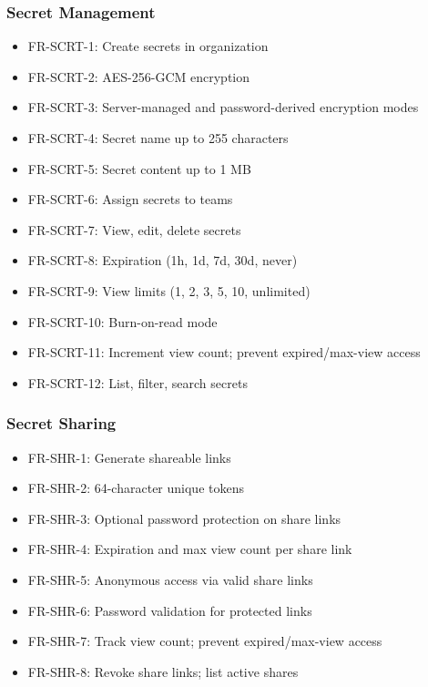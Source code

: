 \documentclass[12pt,a4paper]{article}
\begin{document}
\subsubsection{Secret Management}
\begin{itemize}[leftmargin=*, itemsep=0.1em]
  \item FR-SCRT-1: Create secrets in organization
  \item FR-SCRT-2: AES-256-GCM encryption
  \item FR-SCRT-3: Server-managed and password-derived encryption modes
  \item FR-SCRT-4: Secret name up to 255 characters
  \item FR-SCRT-5: Secret content up to 1 MB
  \item FR-SCRT-6: Assign secrets to teams
  \item FR-SCRT-7: View, edit, delete secrets
  \item FR-SCRT-8: Expiration (1h, 1d, 7d, 30d, never)
  \item FR-SCRT-9: View limits (1, 2, 3, 5, 10, unlimited)
  \item FR-SCRT-10: Burn-on-read mode
  \item FR-SCRT-11: Increment view count; prevent expired/max-view access
  \item FR-SCRT-12: List, filter, search secrets
\end{itemize}

\subsubsection{Secret Sharing}
\begin{itemize}[leftmargin=*, itemsep=0.1em]
  \item FR-SHR-1: Generate shareable links
  \item FR-SHR-2: 64-character unique tokens
  \item FR-SHR-3: Optional password protection on share links
  \item FR-SHR-4: Expiration and max view count per share link
  \item FR-SHR-5: Anonymous access via valid share links
  \item FR-SHR-6: Password validation for protected links
  \item FR-SHR-7: Track view count; prevent expired/max-view access
  \item FR-SHR-8: Revoke share links; list active shares
\end{itemize}
\end{document}
